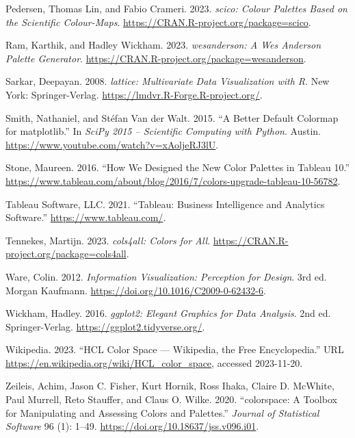 \begin{CSLReferences}{1}{0}
\leavevmode{}%
Pedersen, Thomas Lin, and Fabio Crameri. 2023. \emph{{scico}: Colour Palettes Based on the Scientific Colour-Maps}. \url{https://CRAN.R-project.org/package=scico}.

\leavevmode{}%
Ram, Karthik, and Hadley Wickham. 2023. \emph{{wesanderson}: A {W}es {A}nderson Palette Generator}. \url{https://CRAN.R-project.org/package=wesanderson}.

\leavevmode{}%
Sarkar, Deepayan. 2008. \emph{{lattice}: Multivariate Data Visualization with {R}}. New York: Springer-Verlag. \url{https://lmdvr.R-Forge.R-project.org/}.

\leavevmode{}%
Smith, Nathaniel, and Stéfan Van der Walt. 2015. {``A Better Default Colormap for {matplotlib}.''} In \emph{SciPy 2015 -- Scientific Computing with {Python}}. Austin. \url{https://www.youtube.com/watch?v=xAoljeRJ3lU}.

\leavevmode{}%
Stone, Maureen. 2016. {``How We Designed the New Color Palettes in {Tableau} 10.''} \url{https://www.tableau.com/about/blog/2016/7/colors-upgrade-tableau-10-56782}.

\leavevmode{}%
Tableau Software, LLC. 2021. {``{Tableau}: Business Intelligence and Analytics Software.''} \url{https://www.tableau.com/}.

\leavevmode{}%
Tennekes, Martijn. 2023. \emph{{cols4all}: Colors for All}. \url{https://CRAN.R-project.org/package=cols4all}.

\leavevmode{}%
Ware, Colin. 2012. \emph{Information Visualization: Perception for Design}. 3rd ed. Morgan Kaufmann. \url{https://doi.org/10.1016/C2009-0-62432-6}.

\leavevmode{}%
Wickham, Hadley. 2016. \emph{{ggplot2}: Elegant Graphics for Data Analysis}. 2nd ed. Springer-Verlag. \url{https://ggplot2.tidyverse.org/}.

\leavevmode{}%
Wikipedia. 2023. {``{HCL Color Space} --- {W}ikipedia{,} the Free Encyclopedia.''} URL \url{https://en.wikipedia.org/wiki/HCL_color_space}, accessed 2023-11-20.

\leavevmode{}%
Zeileis, Achim, Jason C. Fisher, Kurt Hornik, Ross Ihaka, Claire D. McWhite, Paul Murrell, Reto Stauffer, and Claus O. Wilke. 2020. {``{colorspace}: A Toolbox for Manipulating and Assessing Colors and Palettes.''} \emph{Journal of Statistical Software} 96 (1): 1--49. \url{https://doi.org/10.18637/jss.v096.i01}.


\end{CSLReferences}
